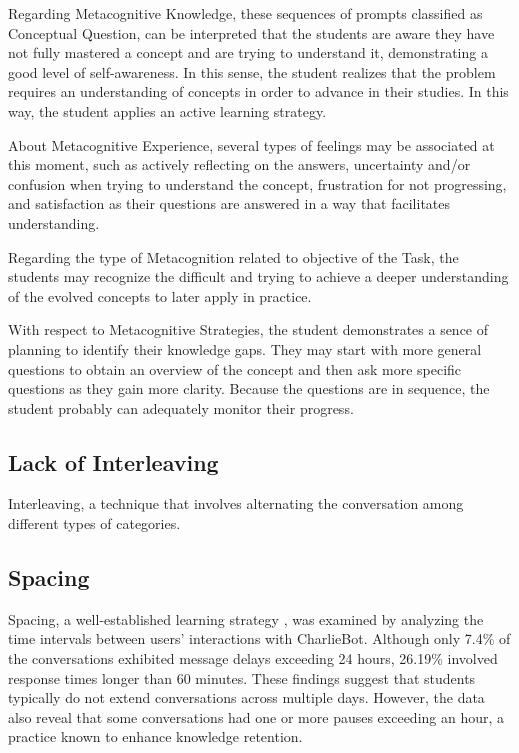 \documentclass[a4paper,twoside]{article}
\begin{document}
Regarding Metacognitive Knowledge, these sequences of prompts classified as
Conceptual Question, can be interpreted that the students are aware they have
not fully mastered a concept and are trying to understand it, demonstrating a
good level of self-awareness. In this sense, the student realizes that the
problem requires an understanding of concepts in order to advance in their
studies. In this way, the student applies an active learning strategy.

About Metacognitive Experience, several types of feelings may be associated at
this moment, such as actively reflecting on the answers, uncertainty and/or
confusion when trying to understand the concept, frustration for not
progressing, and satisfaction as their questions are answered in a way that
facilitates understanding.

Regarding the type of Metacognition related to objective of the Task, the
students may recognize the difficult and trying to achieve a deeper
understanding of the evolved concepts to later apply in practice.

With respect to Metacognitive Strategies, the student demonstrates a sence of
planning to identify their knowledge gaps. They may start with more general
questions to obtain an overview of the concept and then ask more specific
questions as they gain more clarity. Because the questions are in sequence, the
student probably can adequately monitor their progress.

\subsection*{Lack of Interleaving}

Interleaving, a technique that involves alternating the conversation among
different types of categories.


\subsection*{Spacing}

Spacing, a well-established learning strategy \cite{Carvalho20}, was examined
by analyzing the time intervals between users’ interactions with CharlieBot.
Although only 7.4\% of the conversations exhibited message delays exceeding 24
hours, 26.19\% involved response times longer than 60 minutes. These findings
suggest that students typically do not extend conversations across multiple days.
However, the data also reveal that some conversations had one or more pauses
exceeding an hour, a practice known to enhance knowledge retention.
\end{document}
